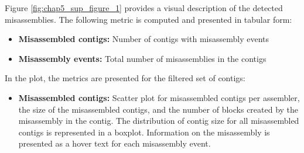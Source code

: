 Figure \ref{fig:chap5_sup_figure_1} provides a visual description of the detected misassemblies. The following metric is computed and presented in tabular form:

\begin{itemize}
    \item \textbf{Misassembled contigs:} Number of contigs with misassembly events
    \item \textbf{Misassembly events:} Total number of misassemblies in the contigs
\end{itemize}

In the plot, the metrics are presented for the filtered set of contigs:

\begin{itemize}
    \item \textbf{Misassembled contigs:} Scatter plot for misassembled contigs per assembler, the size of the misassembled contigs, and the number of blocks created by the misassembly in the contig.  The distribution of contig size for all misassembled contigs is represented in a boxplot. Information on the misassembly is presented as a hover text for each misassembly event.
\end{itemize} 


